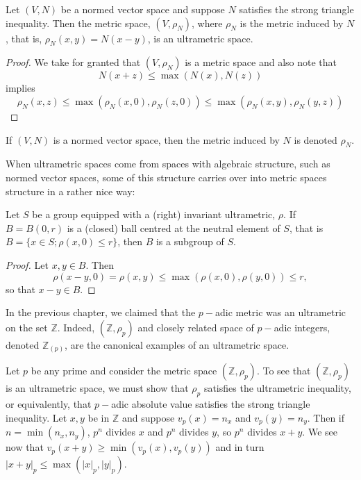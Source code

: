 \begin{proposition}
	Let $(V,N)$ be a normed vector space and suppose $N$ satisfies the strong triangle inequality. Then the metric space, $(V,\rho_N)$, where $\rho_N$ is the metric induced by $N$, that is, $\rho_N(x,y) = N(x-y)$, is an ultrametric space.
\end{proposition}

\begin{proof}
We take for granted that  $(V,\rho_N)$ is a metric space and also note that 
\[N(x + z) \leq \max(N(x), N(z))\]
 implies  
\[\rho_N(x,z) \leq \max(\rho_N(x,0), \rho_N(z,0)) \leq \max(\rho_N(x,y), \rho_N(y,z))\]
\end{proof}

\begin{notation*}
 If $(V, N)$ is a normed vector space, then the metric induced by $N$ is denoted $\rho_N$.
\end{notation*}

When ultrametric spaces come from spaces with algebraic structure, such as normed vector spaces, some of this structure carries over into metric spaces structure in a rather nice way:\\

\begin{proposition}
\cite{ar} Let $S$ be a  group equipped with a (right) invariant ultrametric, $\rho$. If $B=B(0,r)$ is a (closed) ball centred at the neutral element of $S$, that is $B=\{x \in S; \rho(x,0) \leq r\}$, then $B$ is a subgroup of $S$.
\end{proposition}

\begin{proof}
Let $x,y \in B$. Then \[\rho(x-y,0) = \rho(x,y)  \leq \max(\rho(x,0), \rho(y,0)) \leq r,\]
so that $x-y \in B$.
\end{proof}
 
In the previous chapter, we claimed that the $p-$adic metric was an ultrametric on the set $\mathbb{Z}$. Indeed, $(\mathbb{Z}, \rho_p)$ and closely related space of $p-$adic integers, denoted $\mathbb{Z}_{(p)}$, are the canonical examples of an ultrametric space. \\

\begin{example} 
Let $p$ be any prime and consider the metric space $(\mathbb{Z}, \rho_p)$. To see that $(\mathbb{Z}, \rho_p)$ is an ultrametric space, we must show that $\rho_p$ satisfies the ultrametric inequality, or equivalently, that $p-$adic absolute value satisfies the strong triangle inequality. Let $x,y$ be in $\mathbb{Z}$ and suppose $v_p(x)= n_x$ and $v_p(y)= n_y$. Then if $n=\min(n_x,n_y)$, $p^n $ divides $x$ and $p^n$ divides $y$, so $p^n$ divides $x +y$. We see now that $v_p(x+y) \geq \min(v_p(x),  v_p(y))$ and in turn $\lvert x + y \rvert_p \leq \max(\lvert x \rvert_p, \lvert y \rvert_p)$.
\end{example}

